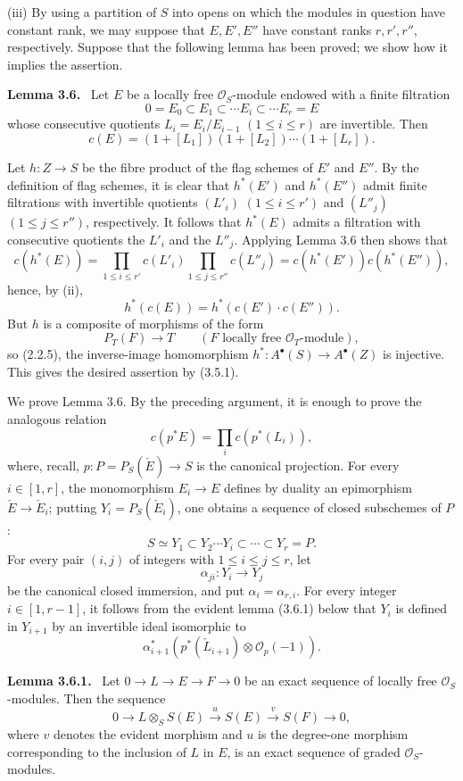 \documentclass[11pt]{article}
\newenvironment{statement}[1]{\par\medskip\noindent\textbf{#1.}\ }{\par\medskip}
\begin{document}
(iii) By using a partition of $S$ into opens on which the modules in question have constant rank, we may suppose that $E,E',E''$ have constant ranks $r,r',r''$, respectively. Suppose that the following lemma has been proved; we show how it implies the assertion.

\begin{statement}{Lemma 3.6}
Let $E$ be a locally free $\mathcal O_S$-module endowed with a finite filtration
\[
0=E_0\subset E_1\subset\cdots E_i\subset\cdots E_r=E
\]
whose consecutive quotients $L_i=E_i/E_{i-1}$ $(1\le i\le r)$ are invertible. Then
\[
c(E)=(1+[L_1])(1+[L_2])\cdots(1+[L_r]).
\]
\end{statement}

Let $h:Z\to S$ be the fibre product of the flag schemes of $E'$ and $E''$. By the definition of flag schemes, it is clear that $h^*(E')$ and $h^*(E'')$ admit finite filtrations with invertible quotients $(L'_i)$ $(1\le i\le r')$ and $(L''_j)$ $(1\le j\le r'')$, respectively. It follows that $h^*(E)$ admits a filtration with consecutive quotients the $L'_i$ and the $L''_j$. Applying Lemma 3.6 then shows that
\[
c(h^*(E))=
\prod_{1\le i\le r'}c(L'_i)\prod_{1\le j\le r''}c(L''_j)
=c(h^*(E'))c(h^*(E'')),
\]
hence, by (ii),
\[
h^*(c(E))=h^*(c(E')\cdot c(E'')).
\tag{3.5.1}
\]
But $h$ is a composite of morphisms of the form
\[
P_T(F)\longrightarrow T
\qquad (F\text{ locally free }\mathcal O_T\text{-module}),
\]
so (2.2.5), the inverse-image homomorphism $h^*:A^{\bullet}(S)\to A^{\bullet}(Z)$ is injective. This gives the desired assertion by (3.5.1).

We prove Lemma 3.6. By the preceding argument, it is enough to prove the analogous relation
\[
c(p^*E)=\prod_i c(p^*(L_i)),
\]
where, recall, $p:P=P_S(\check E)\to S$ is the canonical projection. For every $i\in[1,r]$, the monomorphism $E_i\to E$ defines by duality an epimorphism $\check E\to\check E_i$; putting $Y_i=P_S(\check E_i)$, one obtains a sequence of closed subschemes of $P$:
\[
S\simeq Y_1\subset Y_2\cdots Y_i\subset\cdots\subset Y_r=P.
\]
For every pair $(i,j)$ of integers with $1\le i\le j\le r$, let
\[
\alpha_{ji}:Y_i\to Y_j
\]
be the canonical closed immersion, and put $\alpha_i=\alpha_{r,i}$. For every integer $i\in[1,r-1]$, it follows from the evident lemma (3.6.1) below that $Y_i$ is defined in $Y_{i+1}$ by an invertible ideal isomorphic to
\[
\alpha_{i+1}^*(p^*(\check L_{i+1})\otimes\mathcal O_p(-1)).
\]

\begin{statement}{Lemma 3.6.1}
Let $0\to L\to E\to F\to0$ be an exact sequence of locally free $\mathcal O_S$-modules. Then the sequence
\[
0\to L\otimes_S S(E)\xrightarrow{u}S(E)\xrightarrow{v}S(F)\to0,
\]
where $v$ denotes the evident morphism and $u$ is the degree-one morphism corresponding to the inclusion of $L$ in $E$, is an exact sequence of graded $\mathcal O_S$-modules.
\end{statement}
\end{document}
